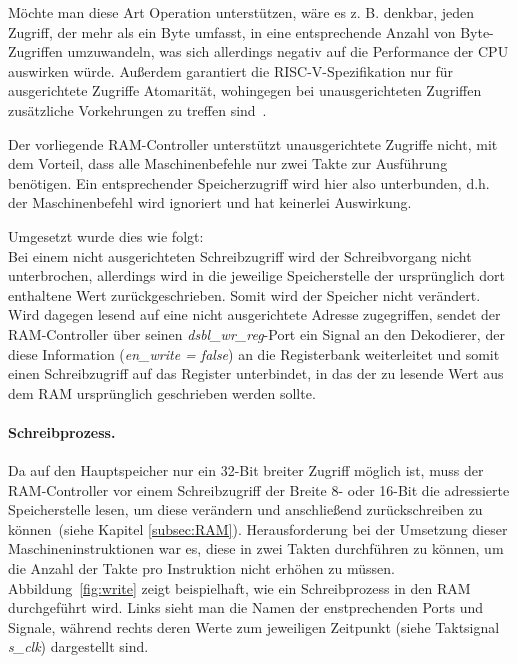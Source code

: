Möchte man diese Art Operation unterstützen, wäre es z. B. denkbar, jeden Zugriff, der mehr als ein Byte umfasst, in eine entsprechende Anzahl von Byte-Zugriffen umzuwandeln, was sich allerdings negativ auf die Performance der CPU auswirken würde.
Außerdem garantiert die RISC-V-Spezifikation nur für ausgerichtete Zugriffe Atomarität, wohingegen bei unausgerichteten Zugriffen zusätzliche Vorkehrungen zu treffen sind~\cite[S. 18]{RISC}.

Der vorliegende RAM-Controller unterstützt unausgerichtete Zugriffe nicht, mit dem Vorteil, dass alle Maschinenbefehle nur zwei Takte zur Ausführung benötigen.
Ein entsprechender Speicherzugriff wird hier also unterbunden, d.h. der Maschinenbefehl wird ignoriert und hat keinerlei Auswirkung.

Umgesetzt wurde dies wie folgt:\\
Bei einem nicht ausgerichteten Schreibzugriff wird der Schreibvorgang nicht unterbrochen, allerdings wird in die jeweilige Speicherstelle der ursprünglich dort enthaltene Wert zurückgeschrieben.
Somit wird der Speicher nicht verändert.\\
Wird dagegen lesend auf eine nicht ausgerichtete Adresse zugegriffen, sendet der RAM-Controller über seinen \textit{dsbl\_wr\_reg}-Port ein Signal an den Dekodierer, der diese Information (\textit{en\_write = false}) an die Registerbank weiterleitet und somit einen Schreibzugriff auf das Register unterbindet, in das der zu lesende Wert aus dem RAM ursprünglich geschrieben werden sollte.

\paragraph{Schreibprozess.} 
Da auf den Hauptspeicher nur ein 32-Bit breiter Zugriff möglich ist, muss der RAM-Controller vor einem Schreibzugriff der Breite 8- oder 16-Bit die adressierte Speicherstelle lesen, um diese verändern und anschließend zurückschreiben zu können~(siehe Kapitel \ref{subsec:RAM}).
Herausforderung bei der Umsetzung dieser Maschineninstruktionen war es, diese in zwei Takten durchführen zu können, um die Anzahl der Takte pro Instruktion nicht erhöhen zu müssen.
Abbildung~\ref{fig:write} zeigt beispielhaft, wie ein Schreibprozess in den RAM durchgeführt wird.
Links sieht man die Namen der enstprechenden Ports und Signale, während rechts deren Werte zum jeweiligen Zeitpunkt (siehe Taktsignal \textit{s\_clk}) dargestellt sind.


